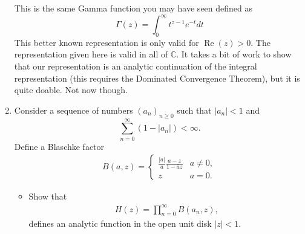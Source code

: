 \documentclass[10pt]{amsart}
\theoremstyle{nonumberplain}
\begin{document}
\begin{enumerate}[label={\bf {\arabic*}:}]
\noindent
This is the same Gamma function you may have seen defined as
$$
\Gamma(z)=\int_0^{\infty} t^{z-1} e^{-t} d t
$$
This better known representation is only valid for
$\operatorname{Re}(z)>0$. The representation given here is valid in
all of $\mathbb{C}$. It takes a bit of work to show that our
representation is an analytic continuation of the integral
representation (this requires the Dominated Convergence Theorem), but
it is quite doable. Not now though. \\
\newpage

\item Consider a sequence of numbers $(a_n)_{n \geq 0}$ such that $|a_n| < 1$ and
$$ \sum_{n = 0}^\infty (1 - |a_n|) < \infty. $$
Define a Blaschke factor
\begin{align*}
B(a,z) =
	\begin{cases}
		\frac{|a|}{a} \frac{ a - z}{ 1 - \bar a z} & a \neq 0,\\
  		z & a  =0.
  	\end{cases}
\end{align*}
\begin{itemize}
\item Show that
\begin{align*}
H(z) = \prod_{n=0}^\infty B(a_n,z),
\end{align*}
defines an analytic function in the open unit disk $|z| < 1$. \\


\end{itemize}
\end{enumerate}
\end{document}
